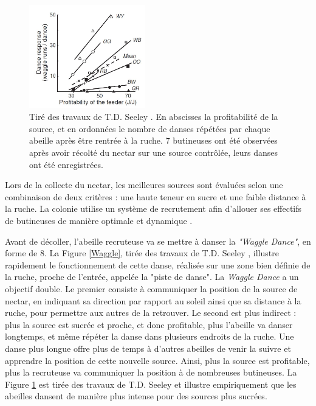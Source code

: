 			
	\begin{figure}
	\centering
	\includegraphics[width=0.45\textwidth]{Pictures/Graphs/SeeleyWaggles.JPG}
	\caption[Tiré des travaux de T.D. Seeley \cite{seeley_wisdom_1995}. En abscisses la profitabilité de la source, et en ordonnées le nombre de 8 (de \textit{Waggle}) réalisés par chaque abeille par danse après être rentrée à la ruche.]{Tiré des travaux de T.D. Seeley \cite{seeley_wisdom_1995}. En abscisses la profitabilité de la source, et en ordonnées le nombre de danses répétées par chaque abeille après être rentrée à la ruche. 7 butineuses ont été observées après avoir récolté du nectar sur une source contrôlée, leurs danses ont été enregistrées.}
	\label{SeeleyWaggles}
	\end{figure}
	
			
			
			Lors de la collecte du nectar, les meilleures sources sont évaluées selon une combinaison de deux critères : une haute teneur en sucre et une faible distance à la ruche. La colonie utilise un système de recrutement afin d'allouer ses effectifs de butineuses de manière optimale et dynamique \cite{riviere_modemulti-agent_2021}.
	
	Avant de décoller, l'abeille recruteuse va se mettre à danser la \textit{"Waggle Dance"}, en forme de 8. La Figure \ref{Waggle}, tirée des travaux de T.D. Seeley \cite{seeley_wisdom_1995}, illustre rapidement le fonctionnement de cette danse, réalisée sur une zone bien définie de la ruche, proche de l'entrée, appelée la "piste de danse". La \textit{Waggle Dance} a un objectif double. Le premier consiste à communiquer la position de la source de nectar, en indiquant sa direction par rapport au soleil ainsi que sa distance à la ruche, pour permettre aux autres de la retrouver. Le second est plus indirect : plus la source est sucrée et proche, et donc profitable, plus l'abeille va danser longtemps, et même répéter la danse dans plusieurs endroits de la ruche. Une danse plus longue offre plus de temps à d'autres abeilles de venir la suivre et apprendre la position de cette nouvelle source. Ainsi, plus la source est profitable, plus la recruteuse va communiquer la position à de nombreuses butineuses. La Figure \ref{SeeleyWaggles} est tirée des travaux de T.D. Seeley \cite{seeley_wisdom_1995} et illustre empiriquement que les abeilles dansent de manière plus intense pour des sources plus sucrées.
			
